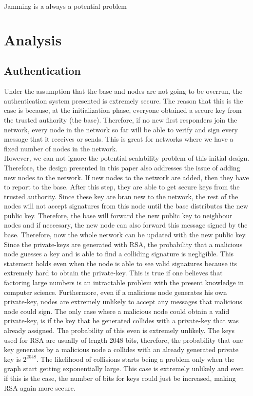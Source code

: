 \documentclass[letterpaper]{article}
\begin{document}
Jamming is a always a potential problem

\section{Analysis}

\subsection{Authentication}
Under the assumption that the base and nodes are not going to be overrun, the authentication system presented is extremely secure. The reason that this is the case is because, at the initialization phase, everyone obtained a secure key from the trusted authority (the base). Therefore, if no new first responders join the network, every node in the network so far will be able to verify and sign every message that it receives or sends. This is great for networks where we have a fixed number of nodes in the network. \\

However, we can not ignore the potential scalability problem of this initial design. Therefore, the design presented in this paper also addresses the issue of adding new nodes to the network. If new nodes to the network are added, then they have to report to the base. After this step, they are able to get secure keys from the trusted authority. Since these key are bran new to the network, the rest of the nodes will not accept signatures from this node until the base distributes the new public key. Therefore, the base will forward the new public key to neighbour nodes and if neccesary, the new node can also forward this message signed by the base. Therefore, now the whole network can be updated with the new public key. \\

Since the private-keys are generated with RSA, the probability that a malicious node guesses a key and is able to find a colliding signature is negligible. This statement holds even when the node is able to see valid signatures because its extremely hard to obtain the private-key. This is true if one believes that factoring large numbers is an intractable problem with the present knowledge in computer science. Furthermore, even if a malicious node generates his own private-key, nodes are extremely unlikely to accept any messages that malicious node could sign. The only case where a malicious node could obtain a valid private-key, is if the key that he generated collides with a private-key that was already assigned. The probability of this even is extremely unlikely. The keys used for RSA are usually of length 2048 bits, therefore, the probability that one key generates by a malicious node a collides with an already generated private key is $2^{2048}$. The likelihood of collisions starts being a problem only when the graph start getting exponentially large. This case is extremely unlikely and even if this is the case, the number of bits for keys could just be increased, making RSA again more secure.\\
\end{document}
